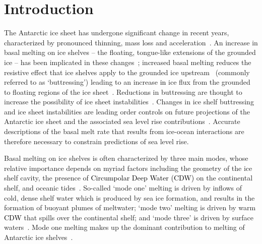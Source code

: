 \documentclass[openacc]{rsproca_new}%
\newcommand{\red}[1]{{\color{red} #1}}
\newcommand{\blue}[1]{{\color{blue} #1}}
\newcommand{\rout}[1]{\red{\st{#1}}}\newcommand{\ab}[1]{\textcolor{Green}{#1}}\newcommand{\about}[1]{\textcolor{Cyan}{\sout{#1}}}
\renewcommand{\rout}[1]{{}} %
\renewcommand{\blue}[1]{{\textcolor{black}{#1}}} %
\renewcommand{\red}[1]{{}} %
\begin{document}
\begin{fmtext}

\end{fmtext}
\maketitle
\section{Introduction}\label{S:Introduction}
The Antarctic ice sheet has undergone significant change in recent years, characterized by pronounced thinning, mass loss and acceleration~\cite[e.g.][]{Pritchard2012Nature, Mouginot2014GRL}. An increase in basal melting on ice shelves -- the floating, tongue-like extensions of the grounded ice -- has been implicated in these changes~\cite{Shepherd2004GRL}; increased basal melting reduces the resistive effect that ice shelves apply to the grounded ice upstream~\cite{Gagliardini2010GRL} (commonly referred to as `buttressing') leading to an increase \blue{in} ice flux from the grounded to floating regions of the ice sheet~\cite{Gudmundsson2013Cryo}. Reductions in buttressing are thought to increase the possibility of ice sheet instabilities~\cite{Schoof2007JGeophysResEarth}. Changes in ice shelf buttressing and ice sheet instabilities are leading order controls on future projections of the Antarctic ice sheet and the associated sea level rise contributions~\cite{Arthern2017GRL}. Accurate descriptions of the basal melt rate that results from ice-ocean interactions are therefore necessary to constrain predictions of sea level rise. 

Basal melting on ice shelves is often characterized by three main modes, whose relative importance depends on myriad factors including the geometry of the ice shelf cavity, the presence of \rout{circumpolar deep water}\blue{Circumpolar Deep Water (CDW)} on the continental shelf, and oceanic tides~\cite{Jacobs1992JGlac}. So-called `mode one' melting is driven by inflows of cold, dense shelf water which is produced by sea ice formation, and results in the formation of buoyant plumes of meltwater; `mode two' melting is driven by warm \rout{Circumpolar Deep Water}\blue{CDW} that spills over the continental shelf; and `mode three' is driven by surface waters~\cite{Silvano2016Oceanography}. Mode one melting makes up the dominant contribution to melting of Antarctic ice shelves~\cite{Adusumilli2020NatureGeo}.
\end{document}
